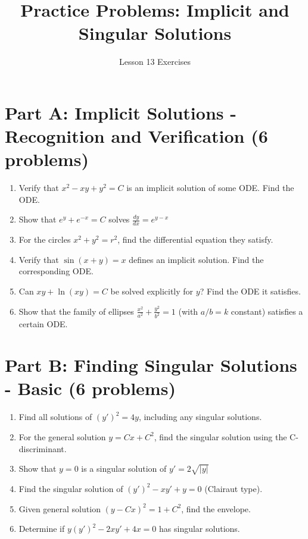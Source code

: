 \documentclass[12pt]{article}
\title{Practice Problems: Implicit and Singular Solutions}
\author{Lesson 13 Exercises}
\begin{document}
\maketitle

\section*{Part A: Implicit Solutions - Recognition and Verification (6 problems)}

\begin{enumerate}
\item Verify that $x^2 - xy + y^2 = C$ is an implicit solution of some ODE. Find the ODE.

\item Show that $e^y + e^{-x} = C$ solves $\frac{dy}{dx} = e^{y-x}$

\item For the circles $x^2 + y^2 = r^2$, find the differential equation they satisfy.

\item Verify that $\sin(x + y) = x$ defines an implicit solution. Find the corresponding ODE.

\item Can $xy + \ln(xy) = C$ be solved explicitly for $y$? Find the ODE it satisfies.

\item Show that the family of ellipses $\frac{x^2}{a^2} + \frac{y^2}{b^2} = 1$ (with $a/b = k$ constant) satisfies a certain ODE.
\end{enumerate}

\section*{Part B: Finding Singular Solutions - Basic (6 problems)}

\begin{enumerate}[resume]
\item Find all solutions of $(y')^2 = 4y$, including any singular solutions.

\item For the general solution $y = Cx + C^2$, find the singular solution using the C-discriminant.

\item Show that $y = 0$ is a singular solution of $y' = 2\sqrt{|y|}$

\item Find the singular solution of $(y')^2 - xy' + y = 0$ (Clairaut type).

\item Given general solution $(y - Cx)^2 = 1 + C^2$, find the envelope.

\item Determine if $y(y')^2 - 2xy' + 4x = 0$ has singular solutions.
\end{enumerate}
\end{document}
